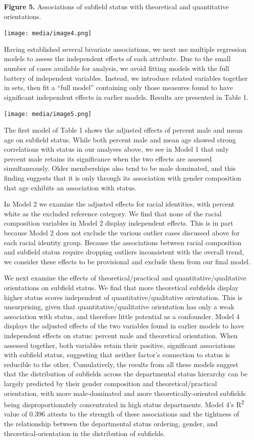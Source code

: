 \documentclass{article}
\begin{document}
\textbf{Figure 5.} Associations of subfield status with theoretical and
quantitative orientations.

\texttt{[image: media/image4.png]}

Having established several bivariate associations, we next use multiple
regression models to assess the independent effects of each attribute.
Due to the small number of cases available for analysis, we avoid
fitting models with the full battery of independent variables. Instead,
we introduce related variables together in sets, then fit a ``full
model'' containing only those measures found to have significant
independent effects in earlier models. Results are presented in Table 1.

\texttt{[image: media/image5.png]}

The first model of Table 1 shows the adjusted effects of percent male
and mean age on subfield status. While both percent male and mean age
showed strong correlations with status in our analyses above, we see in
Model 1 that only percent male retains its significance when the two
effects are assessed simultaneously. Older memberships also tend to be
male dominated, and this finding suggests that it is only through its
association with gender composition that age exhibits an association
with status.

In Model 2 we examine the adjusted effects for racial identities, with
percent white as the excluded reference category. We find that none of
the racial composition variables in Model 2 display independent effects.
This is in part because Model 2 does not exclude the various outlier
cases discussed above for each racial identity group. Because the
associations between racial composition and subfield status require
dropping outliers inconsistent with the overall trend, we consider these
effects to be provisional and exclude them from our final model.

We next examine the effects of theoretical/practical and
quantitative/qualitative orientations on subfield status. We find that
more theoretical subfields display higher status scores independent of
quantitative/qualitative orientation. This is unsurprising, given that
quantitative/qualitative orientation has only a weak association with
status, and therefore little potential as a confounder. Model 4 displays
the adjusted effects of the two variables found in earlier models to
have independent effects on status: percent male and theoretical
orientation. When assessed together, both variables retain their
positive, significant associations with subfield status, suggesting that
neither factor's connection to status is reducible to the other.
Cumulatively, the results from all these models suggest that the
distribution of subfields across the departmental status hierarchy can
be largely predicted by their gender composition and
theoretical/practical orientation, with more male-dominated and more
theoretically-oriented subfields being disproportionately concentrated
in high status departments. Model 4's R\textsuperscript{2} value of
0.396 attests to the strength of these associations and the tightness of
the relationship between the departmental status ordering, gender, and
theoretical-orientation in the distribution of subfields.
\end{document}
